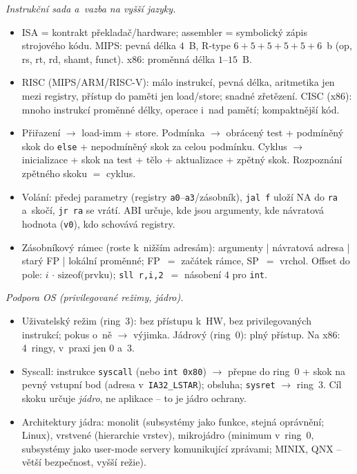 \documentclass[11pt,a4paper]{article}
\begin{document}
\begin{poznamka}
\smallskip
\emph{Instrukční sada a~vazba na vyšší jazyky.}
\begin{itemize}
  \item ISA = kontrakt překladač/hardware; assembler = symbolický zápis strojového kódu. MIPS: pevná délka $4$~B, R-type $6{+}5{+}5{+}5{+}5{+}6$~b (op, rs, rt, rd, shamt, funct). x86: proměnná délka $1$--$15$~B.
  \item RISC (MIPS/ARM/RISC-V): málo instrukcí, pevná délka, aritmetika jen mezi registry, přístup do paměti jen load/store; snadné zřetězení. CISC (x86): mnoho instrukcí proměnné délky, operace i~nad pamětí; kompaktnější kód.
  \item Přiřazení $\to$ load-imm + store. Podmínka $\to$ obrácený test + podmíněný skok do \texttt{else} + nepodmíněný skok za celou podmínku. Cyklus $\to$ inicializace + skok na test + tělo + aktualizace + zpětný skok. Rozpoznání zpětného skoku $=$ cyklus.
  \item Volání: předej parametry (registry \texttt{a0}--\texttt{a3}/zásobník), \texttt{jal f} uloží NA do \texttt{ra} a~skočí, \texttt{jr ra} se vrátí. ABI určuje, kde jsou argumenty, kde návratová hodnota (\texttt{v0}), kdo schovává registry.
  \item Zásobníkový rámec (roste k~nižším adresám): argumenty | návratová adresa | starý FP | lokální proměnné; FP~$=$ začátek rámce, SP~$=$ vrchol. Offset do pole: $i\,{\cdot}\,\text{sizeof(prvku)}$; \texttt{sll r,i,2}~$=$ násobení $4$ pro \texttt{int}.
\end{itemize}

\smallskip
\emph{Podpora OS (privilegované režimy, jádro).}
\begin{itemize}
  \item Uživatelský režim (ring~3): bez přístupu k~HW, bez privilegovaných instrukcí; pokus o~ně $\to$ výjimka. Jádrový (ring~0): plný přístup. Na x86: 4~ringy, v~praxi jen 0 a~3.
  \item Syscall: instrukce \texttt{syscall} (nebo \texttt{int~0x80}) $\to$ přepne do ring~0 + skok na pevný vstupní bod (adresa v~\texttt{IA32\_LSTAR}); obsluha; \texttt{sysret} $\to$ ring~3. Cíl skoku určuje \emph{jádro}, ne aplikace -- to je jádro ochrany.
  \item Architektury jádra: monolit (subsystémy jako funkce, stejná oprávnění; Linux), vrstvené (hierarchie vrstev), mikrojádro (minimum v~ring~0, subsystémy jako user-mode servery komunikující zprávami; MINIX, QNX -- větší bezpečnost, vyšší režie).
\end{itemize}


\end{poznamka}
\end{document}
